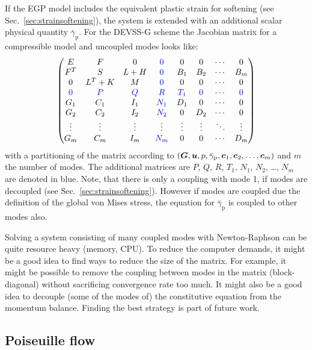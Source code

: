 If the EGP model includes the equivalent plastic strain for softening (see Sec.~\ref{sec:strainsoftening}), the system is extended with an additional scalar physical quantity $\bar\gamma_\text{p}$.
For the DEVSS-G scheme the Jacobian matrix for a compressible model and uncoupled modes looks like:
\[
   \begin{pmatrix}
     E & F & 0 & \textcolor{blue}{0} & 0 & 0 & \cdots & 0 \\
     F^T & S & L+H & \textcolor{blue}{0} & B_1 & B_2 & \cdots & B_m \\
     0 & L^T+K & M &\textcolor{blue}{0} & 0 & 0 & \cdots & 0 \\
     \textcolor{blue}{0} & \textcolor{blue}{P} & \textcolor{blue}{Q} & \textcolor{blue}{R} & \textcolor{blue}{T_1} & \textcolor{blue}{0} & \cdots & \textcolor{blue}{0} \\ 
     G_1 & C_1 & I_1 & \textcolor{blue}{N_1} & D_1 & 0 & \cdots & 0 \\
     G_2 & C_2 & I_2 & \textcolor{blue}{N_2}& 0 & D_2 & \cdots & 0 \\
      \vdots &\vdots  & \vdots & \vdots & \vdots & \vdots & \ddots & \vdots \\
     G_m & C_m& I_m & \textcolor{blue}{N_m}& 0 & 0& \cdots & D_m \\
    \end{pmatrix}
\]
with a partitioning of the matrix according to $(\boldsymbol{G},\boldsymbol{u},p,\bar\gamma_\text{p},\boldsymbol{c}_1,\boldsymbol{c}_2,\dots,\boldsymbol{c}_m)$ and $m$ the number of modes. The additional matrices are $P$, $Q$, $R$, $T_1$, $N_1$, $N_2$, \ldots, $N_m$ are denoted in blue. Note, that there is only a coupling with mode 1, if modes are decoupled (see Sec.~\ref{sec:strainsoftening}). However if modes are coupled due the definition of the global von Mises stress,
the equation for $\bar\gamma_\text{p}$ is coupled to other modes also.

Solving a system consisting of many coupled modes with Newton-Raphson can be quite resource heavy (memory, CPU). To reduce the computer demands, it might be a good idea to find ways to reduce the size of the matrix. For example, it might be possible to remove the coupling between modes in the matrix (block-diagonal) without sacrificing convergence rate too much. It might also be a good idea to decouple (some of the modes of) the constitutive equation from the momentum balance. Finding the best strategy is part of future work.

\subsection{Poiseuille flow}

